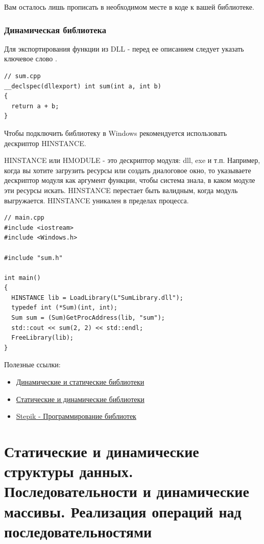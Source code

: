 Вам осталось лишь прописать в необходимом месте в коде  к вашей библиотеке.

\subsubsection*{Динамическая библиотека}

Для экспортирования функции из DLL - перед ее описанием следует указать ключевое слово .

\begin{verbatim}
// sum.cpp
__declspec(dllexport) int sum(int a, int b)
{
  return a + b;
}
\end{verbatim}

Чтобы подключить библиотеку в Windows рекомендуется использовать дескриптор \break HINSTANCE.

HINSTANCE или HMODULE - это дескриптор модуля: dll, exe и т.п. Например, когда вы хотите загрузить ресурсы или создать диалоговое окно, то указываете дескриптор модуля как аргумент функции, чтобы система знала, в каком модуле эти ресурсы искать. HINSTANCE перестает быть валидным, когда модуль выгружается. HINSTANCE уникален в пределах процесса.

\begin{verbatim}
// main.cpp
#include <iostream>
#include <Windows.h>

#include "sum.h"

int main()
{
  HINSTANCE lib = LoadLibrary(L"SumLibrary.dll");
  typedef int (*Sum)(int, int);
  Sum sum = (Sum)GetProcAddress(lib, "sum");
  std::cout << sum(2, 2) << std::endl;
  FreeLibrary(lib);
}
\end{verbatim}

Полезные ссылки:
\begin{itemize}
    \item \href{https://cpp-kt.github.io/cpp-notes/10_libraries.html}   {Динамические и статические библиотеки}
    \item \href{https://ravesli.com/staticheskie-i-dinamicheskie-biblioteki/}{Статические и динамические библиотеки}
    \item \href{https://stepik.org/lesson/770593?unit=773034}{Stepik -  Программирование библиотек}
\end{itemize}

\section{Статические и динамические структуры данных. Последовательности и динамические массивы. Реализация операций над последовательностями} \label{static_and_dynamic_data_structures}

